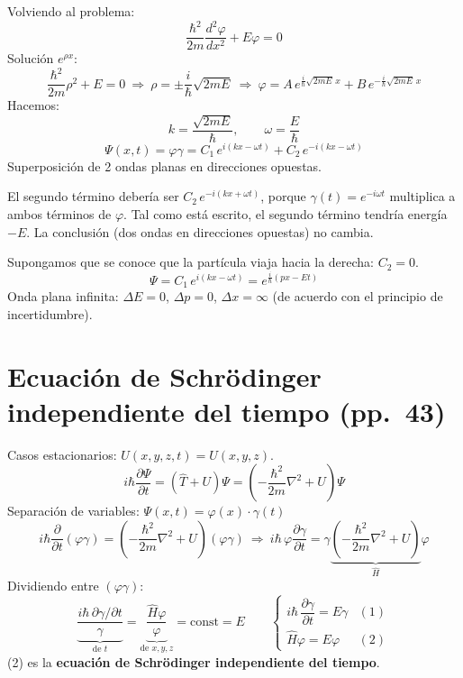 \documentclass[11pt,a4paper]{article}
\newcommand{\pags}[1]{{\normalfont\small\color{gris}(pp.~#1)}}
\begin{document}
Volviendo al problema:
\[
\frac{\hbar^2}{2m}\frac{d^2\varphi}{dx^2}+E\varphi=0
\]
Solución $e^{\rho x}$:
\[
\frac{\hbar^2}{2m}\rho^2+E=0\ \Rightarrow\ \rho=\pm\frac{i}{\hbar}\sqrt{2mE}
\ \Rightarrow\
\varphi=A\,e^{\frac{i}{\hbar}\sqrt{2mE}\,x}+B\,e^{-\frac{i}{\hbar}\sqrt{2mE}\,x}
\]
Hacemos:
\[
k=\frac{\sqrt{2mE}}{\hbar},\qquad \omega=\frac{E}{\hbar}
\]
\[
\Psi(x,t)=\varphi\gamma=C_1\,e^{i(kx-\omega t)}+C_2\,e^{-i(kx-\omega t)}
\]
Superposición de 2 ondas planas en direcciones opuestas.

\begin{obs}
El segundo término debería ser $C_2\,e^{-i(kx+\omega t)}$, porque $\gamma(t)=e^{-i\omega t}$ multiplica a ambos términos de
$\varphi$. Tal como está escrito, el segundo término tendría energía $-E$. La conclusión (dos ondas en direcciones
opuestas) no cambia.
\end{obs}

Supongamos que se conoce que la partícula viaja hacia la derecha: $C_2=0$.
\[
\Psi=C_1\,e^{i(kx-\omega t)}=e^{\frac{i}{\hbar}(px-Et)}
\]
Onda plana infinita: $\Delta E=0$, $\Delta p=0$, $\Delta x=\infty$ (de acuerdo con el principio de incertidumbre).

\section{Ecuación de Schrödinger independiente del tiempo \pags{43}}

Casos estacionarios: $U(x,y,z,t)=U(x,y,z)$.
\[
i\hbar\frac{\partial\Psi}{\partial t}=(\hat T+U)\Psi=\left(-\frac{\hbar^2}{2m}\nabla^2+U\right)\Psi
\]
Separación de variables: $\Psi(x,t)=\varphi(x)\cdot\gamma(t)$
\[
i\hbar\frac{\partial}{\partial t}(\varphi\gamma)=\left(-\frac{\hbar^2}{2m}\nabla^2+U\right)(\varphi\gamma)
\ \Rightarrow\
i\hbar\,\varphi\frac{\partial\gamma}{\partial t}=\gamma\underbrace{\left(-\frac{\hbar^2}{2m}\nabla^2+U\right)}_{\hat H}\varphi
\]
Dividiendo entre $(\varphi\gamma)$:
\[
\underbrace{\frac{i\hbar\,\partial\gamma/\partial t}{\gamma}}_{\text{de }t}=\underbrace{\frac{\hat H\varphi}{\varphi}}_{\text{de }x,y,z}=\text{const}=E
\qquad
\begin{cases} i\hbar\,\dfrac{\partial\gamma}{\partial t}=E\gamma & (1)\\[3mm] \hat H\varphi=E\varphi & (2)\end{cases}
\]
(2) es la \textbf{ecuación de Schrödinger independiente del tiempo}.
\end{document}
